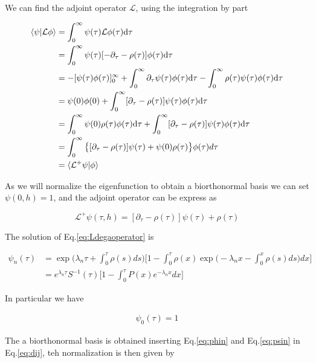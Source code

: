 \documentclass[a4paper,11pt,twoside]{article}
\def \dd  {{\rm d}}
\numberwithin{equation}{section}
\begin{document}
We can find the adjoint operator $\mathcal{L}$, using the integration by part

\begin{align}
\langle\psi|\mathcal{L}\phi\rangle&= \int_{0}^{\infty}\psi(\tau)\mathcal{L}\phi(\tau)\dd\tau  \nonumber \\
&= \int_{0}^{\infty}\psi(\tau)[-\partial_{\tau}-\rho(\tau)]\phi(\tau)\dd\tau  \nonumber \\
&=-[\psi(\tau)\phi(\tau)]^{\infty}_{0}+\int_{0}^{\infty}\partial_{\tau}\psi(\tau)\phi(\tau)\dd\tau -\int_{0}^{\infty}\rho(\tau)\psi(\tau)\phi(\tau)\dd\tau \nonumber \\
&= \psi(0)\phi(0)+ \int_{0}^{\infty}[\partial_{\tau}-\rho(\tau)]\psi(\tau)\phi(\tau)\dd\tau  \nonumber \\
&=\int_{0}^{\infty} \psi(0)\rho(\tau)\phi(\tau)\dd\tau+ \int_{0}^{\infty}[\partial_{\tau}-\rho(\tau)]\psi(\tau)\phi(\tau)\dd\tau  \nonumber \\
&= \int_{0}^{\infty}\big\{[\partial_{\tau}-\rho(\tau)]\psi(\tau)+ \psi(0)\rho(\tau)\big\}\phi(\tau)d\tau  \nonumber \\
& = \langle\mathcal{L}^+\psi|\phi\rangle
\end{align}


As we will normalize the eigenfunction to obtain a biorthonormal basis we can set $\psi(0,h)=1$, and the adjoint operator can be express as

\begin{equation}
\label{eq:Ldega}
\mathcal{L}^+\psi(\tau,h)=[\partial_{\tau}-\rho(\tau)]\psi(\tau)+\rho(\tau)
\end{equation}

The solution of Eq.\eqref{eq:Ldegaoperator} is

\begin{align}
\label{eq:psin}
\psi_n(\tau)&=\exp\big(\lambda_n\tau+\int_0^\tau\rho(s)ds\big)\nonumber\big[1-\int^\tau_0 \rho(x) \exp\big(-\lambda_nx-\int_0^x\rho(s)ds\big)dx\big]\\
&=e^{\lambda_n\tau}S^{-1}(\tau)\big[1-\int^\tau_0 P(x) e^{-\lambda_nx}dx\big]
\end{align}

In particular we have

\begin{align}
\label{eq:psi0}
\psi_0(\tau)=1
\end{align}



The a biorthonormal basis is obtained inserting Eq.\eqref{eq:phin} and Eq.\eqref{eq:psin} in Eq.\eqref{eq:dij}, teh normalization is then given by 
\end{document}
